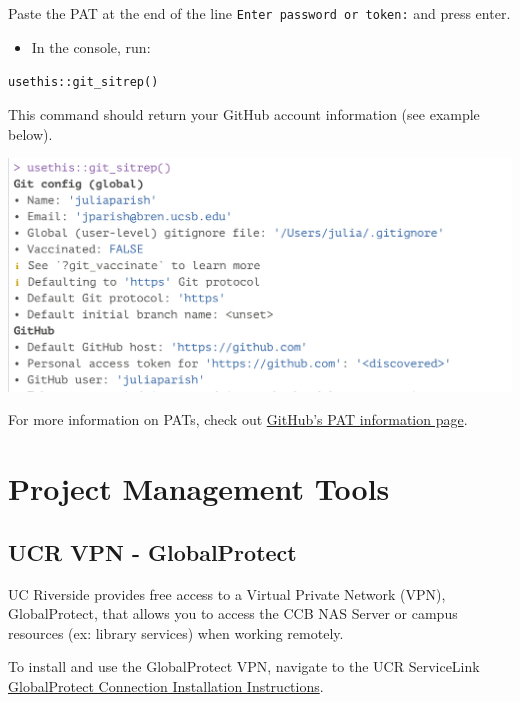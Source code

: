 \documentclass[
]{book}
\providecommand{\tightlist}{%
  \setlength{\itemsep}{0pt}\setlength{\parskip}{0pt}}
\begin{document}
Paste the PAT at the end of the line \texttt{Enter\ password\ or\ token:} and press enter.

\begin{itemize}
\tightlist
\item
  In the console, run:
\end{itemize}

\texttt{usethis::git\_sitrep()}

This command should return your GitHub account information (see example below).

\begin{center}\includegraphics[width=18in]{images/gitsitrep} \end{center}

For more information on PATs, check out \href{https://docs.github.com/en/authentication/keeping-your-account-and-data-secure/creating-a-personal-access-token}{GitHub's PAT information page}.

\hypertarget{projmgmt}{%
\chapter{Project Management Tools}\label{projmgmt}}

\hypertarget{ucr-vpn---globalprotect}{%
\section{UCR VPN - GlobalProtect}\label{ucr-vpn---globalprotect}}

UC Riverside provides free access to a Virtual Private Network (VPN), GlobalProtect, that allows you to access the CCB NAS Server or campus resources (ex: library services) when working remotely.

To install and use the GlobalProtect VPN, navigate to the UCR ServiceLink \href{https://ucrsupport.service-now.com/ucr_portal/?id=kb_article\&sys_id=8a264d791b5f0c149c0b844fdd4bcb34}{GlobalProtect Connection Installation Instructions}.
\end{document}
